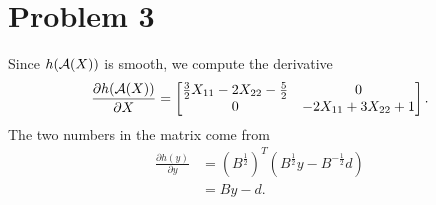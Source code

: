 \section{Problem 3}

Since $h(\mathcal{A}(X))$ is smooth,
we compute the derivative
\begin{equation}
    \frac{\partial h(\mathcal{A}(X))}{\partial X} =
    \begin{bmatrix}
        \frac{3}{2}X_{11}-2X_{22}-\frac{5}{2} & 0 \\
        0   & -2X_{11}+3X_{22}+1 \\
    \end{bmatrix}.
\end{equation}
The two numbers in the matrix come from
\begin{equation}
\begin{split}
    \frac{\partial h(y)}{\partial y}
        &= (B^{\frac{1}{2}})^T(B^{\frac{1}{2}}y-B^{-\frac{1}{2}}d) \\
        &= By-d.
\end{split}
\end{equation}
